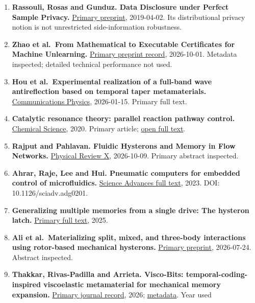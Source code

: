 \documentclass[
  11pt,
]{article}
\begin{document}
\begin{enumerate}
{  Models.} \href{https://arxiv.org/abs/2610.11253}{Primary preprint},
  2026-10-08.
\item
  \textbf{Rassouli, Rosas and Gunduz. Data Disclosure under Perfect
  Sample Privacy.} \href{https://arxiv.org/abs/1904.01711}{Primary
  preprint}, 2019-04-02. Its distributional privacy notion is not
  unrestricted side-information robustness.
\item
  \textbf{Zhao et al.~From Mathematical to Executable Certificates for
  Machine Unlearning.} \href{https://arxiv.org/abs/2610.02268}{Primary
  preprint record}, 2026-10-01. Metadata inspected; detailed technical
  performance not used.
\item
  \textbf{Hou et al.~Experimental realization of a full-band wave
  antireflection based on temporal taper metamaterials.}
  \href{https://www.nature.com/articles/s42005-026-02500-2}{Communications
  Physics}, 2026-01-15. Primary full text.
\item
  \textbf{Catalytic resonance theory: parallel reaction pathway
  control.}
  \href{https://pubs.rsc.org/en/content/articlehtml/2020/sc/c9sc06140a}{Chemical
  Science}, 2020. Primary article;
  \href{https://pmc.ncbi.nlm.nih.gov/articles/PMC8152411/}{open full
  text}.
\item
  \textbf{Rajput and Pahlavan. Fluidic Hysterons and Memory in Flow
  Networks.}
  \href{https://journals.aps.org/prx/abstract/10.1103/hh4n-pw7w}{Physical
  Review X}, 2026-10-09. Primary abstract inspected.
\item
  \textbf{Ahrar, Raje, Lee and Hui. Pneumatic computers for embedded
  control of microfluidics.}
  \href{https://pmc.ncbi.nlm.nih.gov/articles/PMC10413662/}{Science
  Advances full text}, 2023. DOI: 10.1126/sciadv.adg0201.
\item
  \textbf{Generalizing multiple memories from a single drive: The
  hysteron latch.}
  \href{https://pmc.ncbi.nlm.nih.gov/articles/PMC11778092/}{Primary full
  text}, 2025.
\item
  \textbf{Ali et al.~Materializing split, mixed, and three-body
  interactions using rotor-based mechanical hysterons.}
  \href{https://arxiv.org/abs/2607.21974}{Primary preprint}, 2026-07-24.
  Abstract inspected.
\item
  \textbf{Thakkar, Rivas-Padilla and Arrieta. Visco-Bits:
  temporal-coding-inspired viscoelastic metamaterial for mechanical
  memory expansion.} \href{https://doi.org/10.1039/d6mh00721j}{Primary
  journal record}, 2026;
  \href{https://pubmed.ncbi.nlm.nih.gov/42525443/}{metadata}. Year used

\end{enumerate}
\end{document}
